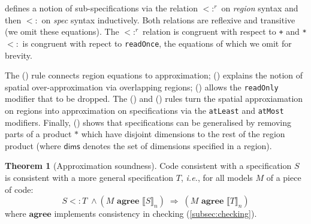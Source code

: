 \documentclass[10pt,preprint]{sigplanconf}
\newcounter{block}
\theoremstyle{definition}
\newtheorem{theorem}[block]{Theorem}
\newcommand{\ie}{\emph{i.e.}}
\newcommand{\interp}[1]{\llbracket{#1}\rrbracket}
\newcommand{\term}[1]{\texttt{#1}}
\newcommand{\trule}[1]{{\footnotesize{(\text{#1})}}}
\newcommand{\consAName}{\textbf{agree}}
\newcommand{\consA}[2]{#1 \,\, \consAName{} \,\, #2}
\begin{document}
 defines a notion of sub-specifications
via the relation $<:^r$ on \textit{region}
syntax and then $<:$ on \textit{spec} syntax inductively.
Both relations are reflexive and transitive (we omit
these equations). The $<:^r$ relation is congruent
with respect to \term{+} and \term{*} $<:$ is congruent
with repect to \term{readOnce}, the equations of which we omit for brevity.

The \trule{\textsc{eq}} rule connects region
equations to approximation; \trule{\textsc{over}} explains
the notion of spatial over-approximation via overlapping regions;
\trule{\textsc{rep}} allows the \term{readOnly} modifier that
to be dropped. The \trule{\textsc{shrink}}
and \trule{\textsc{grow}} rules turn the spatial approxiamation on
regions into approximation on specifications via the \term{atLeast} and \term{atMost}
modifiers. Finally, \trule{\textsc{Gen$\ast$}} shows
that specifications can be generalised by removing parts of a product
$\ast$ which have disjoint dimensions to the rest of the region
product (where $\mathsf{dims}$ denotes the set of dimensions specified
in a region).

\begin{theorem}[Approximation soundness]
Code consistent with a specification $S$
 is consistent with a more general specification $T$,
\ie{}, for all models $M$ of a piece of code:
\begin{equation*}
S <: T \; \wedge (\consA{M}{\interp{S}_n}) \;
\Rightarrow \; (\consA{M}{\interp{T}_n})
\end{equation*}
where $\consAName$ implements consistency in checking (\cref{subsec:checking}).
\end{theorem}
\end{document}
